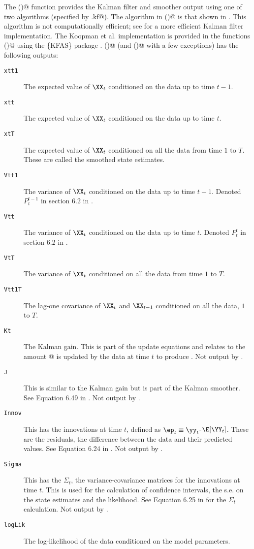 The \verb@MARSSkf()@ function provides the Kalman filter and smoother output using one of two algorithms (specified by \verb@fun.kf@).  The algorithm in 
\verb@MARSSkfss()@ is that shown in \citet{ShumwayStoffer2006}.  This algorithm is not computationally efficient; see \citet[section 4.3]{Koopmanetal1998} for a more efficient Kalman filter implementation. The Koopman et al. implementation is provided in the functions \verb@MARSSkfas()@ using the \{KFAS\} package \citep{Helske2017}.  \verb@MARSSkfss()@ (and \verb@MARSSkfas()@ with a few exceptions) has the following outputs:
\begin{description}
\item[\texttt{xtt1 }] The expected value of $\XX_t$ conditioned on the data up to time $t-1$.
\item[\texttt{xtt  }] The expected value of $\XX_t$ conditioned on the data up to time $t$.
\item[\texttt{xtT  }] The expected value of $\XX_t$ conditioned on all the data from time $1$ to $T$.  These are called the smoothed state estimates.
\item[\texttt{Vtt1 }] The variance of $\XX_t$ conditioned on the data up to time $t-1$.  Denoted $P_t^{t-1}$ in section 6.2 in \citet{ShumwayStoffer2006}.
\item[\texttt{Vtt  }] The variance of $\XX_t$ conditioned on the data up to time $t$. Denoted $P_t^t$ in section 6.2 in \citet{ShumwayStoffer2006}.
\item[\texttt{VtT  }] The variance of $\XX_t$ conditioned on all the data from time $1$ to $T$.
\item[\texttt{Vtt1T}] The lag-one covariance of $\XX_t$ and $\XX_{t-1}$ conditioned on all the data, $1$ to $T$.
\item[\texttt{Kt   }] The Kalman gain.  This is part of the update equations and relates to the amount @ is updated by the data at time $t$ to produce \verb@xtt@.    Not  output by \verb@MARSSkfas@.
\item[\texttt{J    }] This is similar to the Kalman gain but is part of the Kalman smoother.  See Equation 6.49 in \citet{ShumwayStoffer2006}.     Not  output by \verb@MARSSkfas@.
\item[\texttt{Innov}] This has the innovations at time $t$, defined as $\ep_t \equiv \yy_t$-$\E[\YY_t]$.  These are the residuals, the difference between the data and their predicted values.  See Equation 6.24 in \citet{ShumwayStoffer2006}. Not  output by \verb@MARSSkfas@.
\item[\texttt{Sigma}] This has the $\Sigma_t$, the variance-covariance matrices for the innovations at time $t$.  This is used for the calculation of confidence intervals, the s.e. on the state estimates and the likelihood.  See Equation 6.25 in \citet{ShumwayStoffer2006} for the $\Sigma_t$ calculation.  Not  output by \verb@MARSSkfas@.
\item[\texttt{logLik}] The log-likelihood of the data conditioned on the model parameters.  
\end{description}

